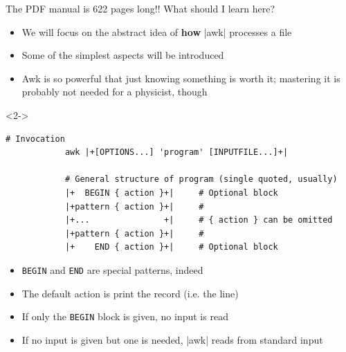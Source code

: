 \begin{frame}[fragile]{The PDF manual is 622 pages long!! What should I learn here?}
    \vspace{-2mm}
    \begin{itemize}
        \item We will focus on the abstract idea of \textbf{how} \bash|awk| processes a file
        \item Some of the simplest aspects will be introduced
        \item Awk is so powerful that just knowing something is worth it; mastering it is probably not needed for a physicist, though
    \end{itemize}
    \begin{uncoverenv}<2->
        \begin{lstlisting}[style=MyBash, numbers=none, aboveskip=2mm, belowskip=-5mm]
            # Invocation
            awk |+[OPTIONS...] 'program' [INPUTFILE...]+|

            # General structure of program (single quoted, usually)
            |+  BEGIN { action }+|     # Optional block
            |+pattern { action }+|     #
            |+...               +|     # { action } can be omitted
            |+pattern { action }+|     #
            |+    END { action }+|     # Optional block
        \end{lstlisting}
    \end{uncoverenv}
    \begin{itemize}[<3>]
        \item \texttt{BEGIN} and \texttt{END} are special patterns, indeed
        \item The default action is print the record (i.e. the line)
        \item If only the \texttt{BEGIN} block is given, no input is read
        \item If no input is given but one is needed, \bash|awk| reads from standard input
    \end{itemize}
\end{frame}
